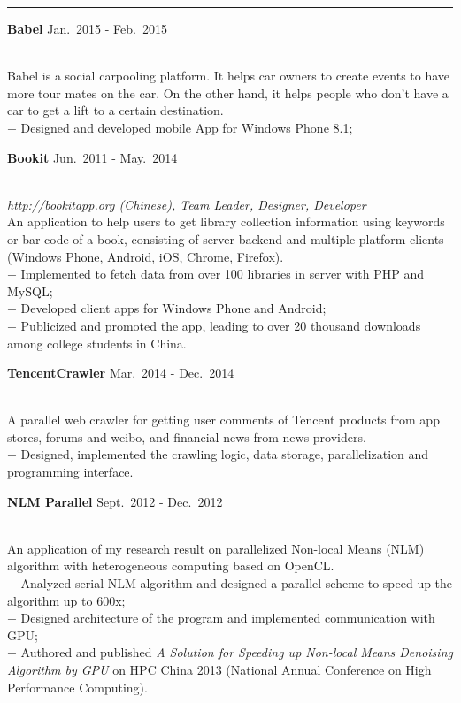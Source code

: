 \documentclass[a4paper,10pt]{article}
\newcommand{\shadedsection}[1]{
    \setlength{\fboxsep}{0pt}
    \colorbox{shadecolor}{%
        \begin{minipage}{\linewidth}%
            \vspace{0.2em}%
            #1%
        \end{minipage}%
    }
}
\newenvironment{rSection}[1]{ %
  \medskip
  \hspace{-1.5em}{\color{Blue}\MakeUppercase{\large \bf {#1}}} %
  \vspace{-0.2em}
  \medskip
  \hrule %
  \begin{list}{}{ %
    \setlength{\leftmargin}{1.5em} %
  }
\setlength{\itemsep}{1pt}
  \item[]
}{
  \end{list}
}
\newcommand{\detail}[1]{{$-$ {#1}}}
\newcommand{\period}[3]{\normalsize {#1} \hfill {#2} - {#3}}
\begin{document}
\vspace{-0.5em}

\begin{rSection}{Relevant Projects}
  \vspace{-1.5em}
  \item
    \shadedsection{\period{\bf Babel}{Jan.~2015}{Feb.~2015}}\\
    Babel is a social carpooling platform. It helps car owners to create events to have more tour mates on the car. On the other hand, it helps people who don't have a car to get a lift to a certain destination.\\
    \detail{Designed and developed mobile App for Windows Phone 8.1;}
   
  \item
    \shadedsection{\period{\bf Bookit}{Jun.~2011}{May.~2014}}\\
    {\em http://bookitapp.org (Chinese), Team Leader, Designer, Developer}\\
    An application to help users to get library collection information using keywords or bar code of a book, consisting of server backend and multiple platform clients (Windows Phone, Android, iOS, Chrome, Firefox).\\
    \detail{Implemented to fetch data from over 100 libraries in server with PHP and MySQL;}\\
    \detail{Developed client apps for Windows Phone and Android;}\\
    \detail{Publicized and promoted the app, leading to over 20 thousand downloads among college students in China.}
    
  \item
    \shadedsection{\period{\bf TencentCrawler}{Mar.~2014}{Dec.~2014}}\\
    A parallel web crawler for getting user comments of Tencent products from app stores, forums and weibo, and financial news from news providers.\\
    \detail{Designed, implemented the crawling logic, data storage, parallelization and programming interface.}
    
  \item
    \shadedsection{\period{\bf NLM Parallel}{Sept.~2012}{Dec.~2012}}\\
    An application of my research result on parallelized Non-local Means (NLM) algorithm with heterogeneous computing based on OpenCL.\\
    \detail{Analyzed serial NLM algorithm and designed a parallel scheme to speed up the algorithm up to 600x;}\\
    \detail{Designed architecture of the program and implemented communication with GPU;}\\
    \detail{Authored and published {\em A Solution for Speeding up Non-local Means Denoising Algorithm by GPU} on HPC China 2013 (National Annual Conference on High Performance Computing).}
    
\end{rSection}
\end{document}
